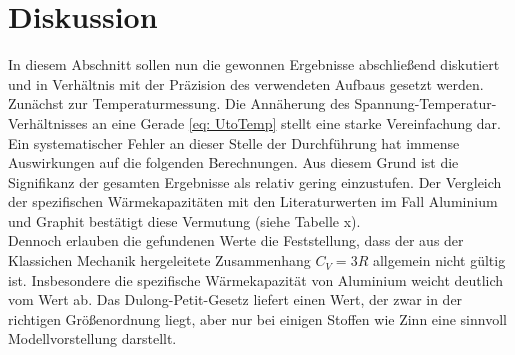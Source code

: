 \section{Diskussion}
In diesem Abschnitt sollen nun die gewonnen Ergebnisse abschließend diskutiert und in
Verhältnis mit der Präzision des verwendeten Aufbaus gesetzt werden. \\
Zunächst zur Temperaturmessung. Die Annäherung des Spannung-Temperatur-Verhältnisses
an eine Gerade \eqref{eq: UtoTemp} stellt eine starke Vereinfachung dar. Ein systematischer
Fehler an dieser Stelle der Durchführung hat immense Auswirkungen auf die folgenden Berechnungen.
Aus diesem Grund ist die Signifikanz der gesamten Ergebnisse als relativ gering einzustufen.
Der Vergleich der spezifischen Wärmekapazitäten mit den Literaturwerten im Fall Aluminium und Graphit bestätigt diese Vermutung (siehe
Tabelle x). \\
Dennoch erlauben die gefundenen Werte die Feststellung, dass der aus der Klassichen Mechanik hergeleitete Zusammenhang $C_V = 3R$ allgemein
nicht gültig ist. Insbesondere die spezifische Wärmekapazität von Aluminium weicht deutlich vom Wert ab. Das Dulong-Petit-Gesetz liefert
einen Wert, der zwar in der richtigen Größenordnung liegt, aber nur bei einigen Stoffen wie Zinn eine sinnvoll Modellvorstellung darstellt.
